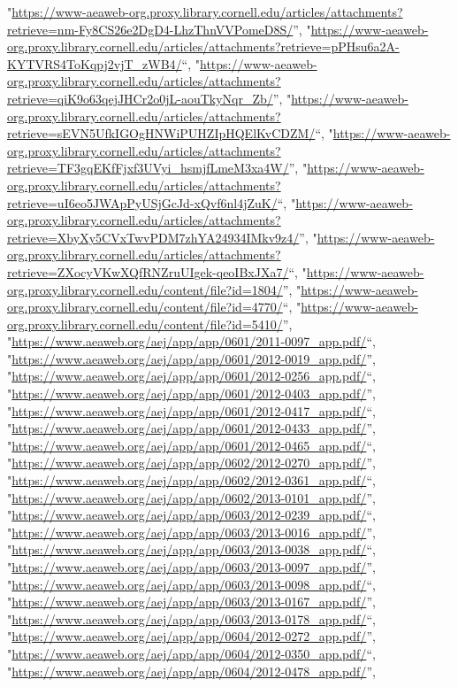 \documentclass[]{article}
\begin{document}
\begin{itemize}
  "\url{https://www-aeaweb-org.proxy.library.cornell.edu/articles/attachments?retrieve=nm-Fy8CS26e2DgD4-LhzThnVVPomeD8S/}'',
  "\url{https://www-aeaweb-org.proxy.library.cornell.edu/articles/attachments?retrieve=pPHsu6a2A-KYTVRS4ToKqpj2vjT_zWB4/}``,
  "\url{https://www-aeaweb-org.proxy.library.cornell.edu/articles/attachments?retrieve=qiK9o63qejJHCr2o0jL-aouTkyNqr_Zb/}'',
  "\url{https://www-aeaweb-org.proxy.library.cornell.edu/articles/attachments?retrieve=sEVN5UfkIGOgHNWiPUHZIpHQElKvCDZM/}``,
  "\url{https://www-aeaweb-org.proxy.library.cornell.edu/articles/attachments?retrieve=TF3gqEKfFjxf3UVyi_hsmjfLmeM3xa4W/}'',
  "\url{https://www-aeaweb-org.proxy.library.cornell.edu/articles/attachments?retrieve=uI6eo5JWApPyUSjGcJd-xQvf6nl4jZuK/}``,
  "\url{https://www-aeaweb-org.proxy.library.cornell.edu/articles/attachments?retrieve=XbyXy5CVxTwvPDM7zhYA24934IMkv9z4/}'',
  "\url{https://www-aeaweb-org.proxy.library.cornell.edu/articles/attachments?retrieve=ZXocyVKwXQfRNZruUIgek-qeoIBxJXa7/}``,
  "\url{https://www-aeaweb-org.proxy.library.cornell.edu/content/file?id=1804/}'',
  "\url{https://www-aeaweb-org.proxy.library.cornell.edu/content/file?id=4770/}``,
  "\url{https://www-aeaweb-org.proxy.library.cornell.edu/content/file?id=5410/}'',
  "\url{https://www.aeaweb.org/aej/app/app/0601/2011-0097_app.pdf/}``,
  "\url{https://www.aeaweb.org/aej/app/app/0601/2012-0019_app.pdf/}'',
  "\url{https://www.aeaweb.org/aej/app/app/0601/2012-0256_app.pdf/}``,
  "\url{https://www.aeaweb.org/aej/app/app/0601/2012-0403_app.pdf/}'',
  "\url{https://www.aeaweb.org/aej/app/app/0601/2012-0417_app.pdf/}``,
  "\url{https://www.aeaweb.org/aej/app/app/0601/2012-0433_app.pdf/}'',
  "\url{https://www.aeaweb.org/aej/app/app/0601/2012-0465_app.pdf/}``,
  "\url{https://www.aeaweb.org/aej/app/app/0602/2012-0270_app.pdf/}'',
  "\url{https://www.aeaweb.org/aej/app/app/0602/2012-0361_app.pdf/}``,
  "\url{https://www.aeaweb.org/aej/app/app/0602/2013-0101_app.pdf/}'',
  "\url{https://www.aeaweb.org/aej/app/app/0603/2012-0239_app.pdf/}``,
  "\url{https://www.aeaweb.org/aej/app/app/0603/2013-0016_app.pdf/}'',
  "\url{https://www.aeaweb.org/aej/app/app/0603/2013-0038_app.pdf/}``,
  "\url{https://www.aeaweb.org/aej/app/app/0603/2013-0097_app.pdf/}'',
  "\url{https://www.aeaweb.org/aej/app/app/0603/2013-0098_app.pdf/}``,
  "\url{https://www.aeaweb.org/aej/app/app/0603/2013-0167_app.pdf/}'',
  "\url{https://www.aeaweb.org/aej/app/app/0603/2013-0178_app.pdf/}``,
  "\url{https://www.aeaweb.org/aej/app/app/0604/2012-0272_app.pdf/}'',
  "\url{https://www.aeaweb.org/aej/app/app/0604/2012-0350_app.pdf/}``,
  "\url{https://www.aeaweb.org/aej/app/app/0604/2012-0478_app.pdf/}'',

\end{itemize}
\end{document}
